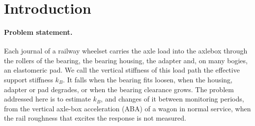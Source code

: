 \section{Introduction}\label{sec:intro}

\paragraph{Problem statement.} Each journal of a railway wheelset carries the axle load into the
axlebox through the rollers of the bearing, the bearing housing, the adapter and, on many bogies, an
elastomeric pad. We call the vertical stiffness of this load path the effective support stiffness
$k_B$. It falls when the bearing fits loosen, when the housing, adapter or pad degrades, or when the
bearing clearance grows. The problem addressed here is to estimate $k_B$, and changes of it between
monitoring periods, from the vertical axle-box acceleration (ABA) of a wagon in normal service, when the
rail roughness that excites the response is not measured.

